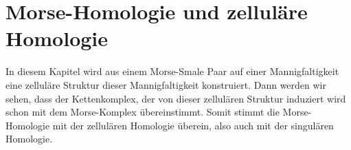 \documentclass[a4paper,11pt,twoside]{scrreport}
\begin{document}



\chapter{Morse-Homologie und zelluläre Homologie}

In diesem Kapitel wird aus einem Morse-Smale Paar auf einer Mannigfaltigkeit
eine zelluläre Struktur dieser Mannigfaltigkeit konstruiert. Dann werden wir 
sehen, dass der Kettenkomplex, der von dieser zellulären Struktur induziert wird schon mit
dem Morse-Komplex übereinstimmt. Somit stimmt die Morse-Homologie mit der 
zellulären Homologie überein, also auch mit der singulären Homologie.






% 

\printbibliography

\eject
\end{document}
